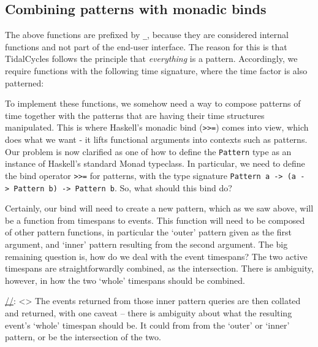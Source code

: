 \subsection{Combining patterns with monadic
binds}\label{combining-patterns-with-monadic-binds}

The above functions are prefixed by \texttt{\_}, because they are
considered internal functions and not part of the end-user interface.
The reason for this is that TidalCycles follows the principle that
\emph{everything} is a pattern. Accordingly, we require functions with
the following time signature, where the time factor is also patterned:

\begin{Shaded}
\begin{Highlighting}[]
   \OtherTok{{-}\textgreater{}} \OtherTok{{-}\textgreater{}} 
\end{Highlighting}
\end{Shaded}

To implement these functions, we somehow need a way to compose patterns
of time together with the patterns that are having their time structures
manipulated. This is where Haskell's monadic bind
(\texttt{\textgreater{}\textgreater{}=}) comes into view, which does
what we want - it lifts functional arguments into contexts such as
patterns. Our problem is now clarified as one of how to define the
\texttt{Pattern} type as an instance of Haskell's standard Monad
typeclass. In particular, we need to define the bind operator
\texttt{\textgreater{}\textgreater{}=} for patterns, with the type
signature
\texttt{Pattern\ a\ -\textgreater{}\ (a\ -\textgreater{}\ Pattern\ b)\ -\textgreater{}\ Pattern\ b}.
So, what should this bind do?

Certainly, our bind will need to create a new pattern, which as we saw
above, will be a function from timespans to events. This function will
need to be composed of other pattern functions, in particular the
`outer' pattern given as the first argument, and `inner' pattern
resulting from the second argument. The big remaining question is, how
do we deal with the event timespans? The two active timespans are
straightforwardly combined, as the intersection. There is ambiguity,
however, in how the two `whole' timespans should be combined.

\href{}{//}: \textless\textgreater{} The events returned from those
inner pattern queries are then collated and returned, with one caveat --
there is ambiguity about what the resulting event's `whole' timespan
should be. It could from from the `outer' or `inner' pattern, or be the
intersection of the two.

